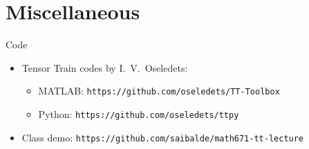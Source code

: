 \documentclass[aspectratio=169]{beamer}
\begin{document}
\section{Miscellaneous}

\begin{frame}{Code}
  \begin{itemize}
    \item
      Tensor Train codes by I.\ V.\ Oseledets:
      \begin{itemize}
        \item
          MATLAB: \texttt{https://github.com/oseledets/TT-Toolbox}
        \item
          Python: \texttt{https://github.com/oseledets/ttpy}
      \end{itemize}
    \item
      Class demo: \texttt{https://github.com/saibalde/math671-tt-lecture}
  \end{itemize}
\end{frame}
\end{document}
